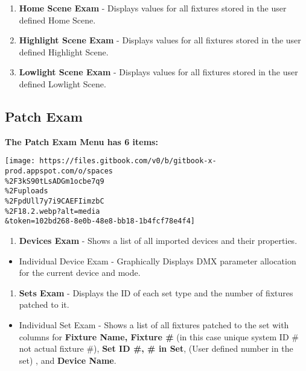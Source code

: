 \documentclass[
]{article}
\providecommand{\tightlist}{%
  \setlength{\itemsep}{0pt}\setlength{\parskip}{0pt}}
\begin{document}
\begin{enumerate}
\def\labelenumi{\arabic{enumi}.}
\setcounter{enumi}{11}
\item
  \textbf{Home Scene Exam} - Displays values for all fixtures stored in the user defined Home Scene.
\item
  \textbf{Highlight Scene Exam} - Displays values for all fixtures stored in the user defined Highlight Scene.
\item
  \textbf{Lowlight Scene Exam} - Displays values for all fixtures stored in the user defined Lowlight Scene.
\end{enumerate}

\hypertarget{patch-exam}{%
\subsection{Patch Exam}\label{patch-exam}}

\textbf{The Patch Exam Menu has 6 items:}

\texttt{[image: https://files.gitbook.com/v0/b/gitbook-x-prod.appspot.com/o/spaces\\\%2F3kS90tLsADGm1ocbe7q9\\\%2Fuploads\\\%2FpdUll7y7i9CAEFIimzbC\\\%2F18.2.webp?alt=media\\\&token=102bd268-8e0b-48e8-bb18-1b4fcf78e4f4]}

\begin{enumerate}
\def\labelenumi{\arabic{enumi}.}
\tightlist
\item
  \textbf{Devices Exam} - Shows a list of all imported devices and their properties.
\end{enumerate}

\begin{itemize}
\tightlist
\item
  Individual Device Exam - Graphically Displays DMX parameter allocation for the current device and mode.
\end{itemize}

\begin{enumerate}
\def\labelenumi{\arabic{enumi}.}
\setcounter{enumi}{1}
\tightlist
\item
  \textbf{Sets Exam} - Displays the ID of each set type and the number of fixtures patched to it.
\end{enumerate}

\begin{itemize}
\tightlist
\item
  Individual Set Exam - Shows a list of all fixtures patched to the set with columns for \textbf{Fixture Name, Fixture \#} (in this case unique system ID \# not actual fixture \#), \textbf{Set ID \#, \# in Set}, (User defined number in the set) , and \textbf{Device Name}.
\end{itemize}
\end{document}
